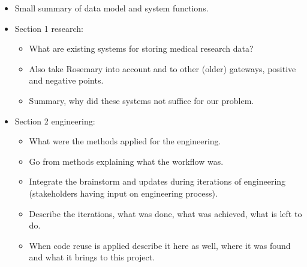 \begin{itemize}
	\item Small summary of data model and system functions.
	\item Section 1 research:
	\begin{itemize}
		\item What are existing systems for storing medical research data?
		\item Also take Rosemary into account and to other (older) gateways, positive and negative points.
		\item Summary, why did these systems not suffice for our problem.
	\end{itemize}
	\item Section 2 engineering:
	\begin{itemize}
		\item What were the methods applied for the engineering.
		\item Go from methods explaining what the workflow was.
		\item Integrate the brainstorm and updates during iterations of engineering (stakeholders having input on engineering process).
		\item Describe the iterations, what was done, what was achieved, what is left to do.
		\item When code reuse is applied describe it here as well, where it was found and what it brings to this project.
	\end{itemize}
\end{itemize}